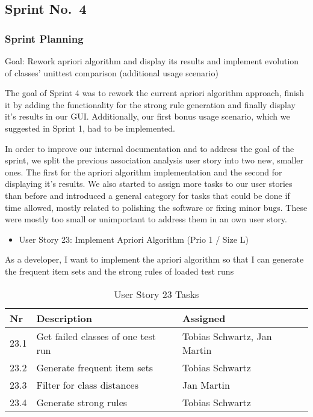 
\subsection{Sprint No.~4}

\subsubsection*{Sprint Planning}

Goal: Rework apriori algorithm and display its results and implement evolution of classes' unittest comparison (additional usage scenario)

The goal of Sprint 4 was to rework the current apriori algorithm approach, finish it by adding the functionality for the strong rule generation and finally display it's results in our GUI.
Additionally, our first bonus usage scenario, which we suggested in Sprint 1, had to be implemented.

In order to improve our internal documentation and to address the goal of the sprint, we split the previous association analysis user story into two new, smaller ones. The first for the apriori algorithm implementation and the second for displaying it's results. We also started to assign more tasks to our user stories than before and introduced a general category for tasks that could be done if time allowed, mostly related to polishing the software or fixing minor bugs. These were mostly too small or unimportant to address them in an own user story.

\begin{itemize}
	\item User Story 23: Implement Apriori Algorithm (Prio 1 / Size L)
	\end{itemize}
As a developer,
I want to implement the apriori algorithm
so that I can generate the frequent item sets and the strong rules of loaded test runs
\begin{table}[h]
  \caption{User Story 23 Tasks}
  \label{Story 23 Tasks}
  \centering
  \begin{tabular}{p{1cm}|p{5cm}|p{3cm}|}
  	Nr & Description & Assigned \\ 
  	\hline
  	23.1 & Get failed classes of one test run & Tobias Schwartz, Jan Martin \\ 
  	\hline
  	23.2 & Generate frequent item sets & Tobias Schwartz \\ 
  	\hline
  	23.3 & Filter for class distances & Jan Martin \\ 
  	\hline
  	23.4 & Generate strong rules & Tobias Schwartz \\ 
  	\hline
  \end{tabular}
\end{table}

